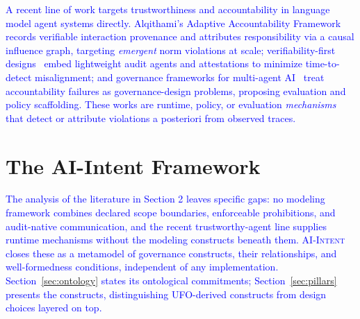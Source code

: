 \documentclass[runningheads]{llncs}
\begin{document}
\textcolor{blue}{A recent line of work targets trustworthiness and accountability in language model agent systems directly. Alqithami's Adaptive Accountability Framework~\cite{alqithami2025adaptive} records verifiable interaction provenance and attributes responsibility via a causal influence graph, targeting \emph{emergent} norm violations at scale; verifiability-first designs~\cite{gupta2025verifiability} embed lightweight audit agents and attestations to minimize time-to-detect misalignment; and governance frameworks for multi-agent AI~\cite{pujari2024ethical,bamil2026unified,am2026self} treat accountability failures as governance-design problems,  proposing evaluation and policy scaffolding. These works 
are runtime, policy, or evaluation \emph{mechanisms}  that detect or attribute violations a posteriori from observed traces.}


\section{The AI-Intent Framework}
\label{sec:framework}

\textcolor{blue}{The analysis of the literature in Section 2 leaves specific gaps: no modeling framework combines declared scope boundaries, enforceable prohibitions, and audit-native communication, and the recent trustworthy-agent line supplies runtime mechanisms without the modeling constructs beneath them. \textsc{AI-Intent} closes these as a metamodel of governance constructs, their relationships, and well-formedness conditions, independent of any implementation. Section~\ref{sec:ontology} states its ontological commitments; Section~\ref{sec:pillars} presents the constructs, distinguishing UFO-derived constructs from design choices layered on top.}
\end{document}
